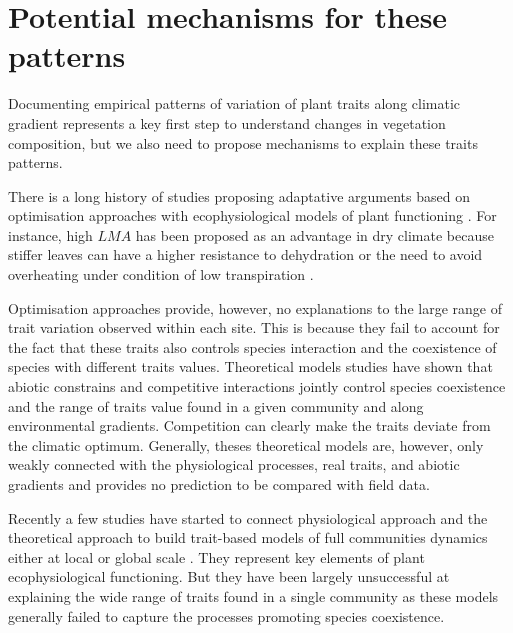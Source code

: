 \documentclass[a4paper,11pt]{article}
\begin{document}
\clearpage

\section{Potential mechanisms for these patterns}

Documenting empirical patterns of variation of plant traits along
climatic gradient represents a key first step to understand changes in
vegetation composition, but we also need to propose mechanisms to
explain these traits patterns. 


There is a long history of studies
proposing adaptative arguments based on optimisation approaches with
ecophysiological models of plant functioning \citep{Makela-2002}. For instance, high $LMA$ has been proposed as an advantage in dry climate because
stiffer leaves can have a higher resistance to dehydration
\citep{Wright-2002a,Wright-2002b} or the need to avoid overheating
under condition of low transpiration \citep{Leigh-2012}.


Optimisation approaches provide, however, no explanations to the large range of trait variation observed
within each site. This is because they fail to account for the fact that
these traits also controls species interaction and the coexistence of
species with different traits values. 
Theoretical models \citep{Case-2000,Goldberg-2006,Leimar-2008}
studies have shown that abiotic constrains and competitive interactions jointly control species coexistence \citep{Chesson-2018} and the range of traits
value found in a given community and along environmental gradients. Competition can clearly make the traits deviate from the climatic optimum.  Generally, theses theoretical models are, however, only weakly connected with the physiological processes, real traits, and abiotic gradients and provides no prediction to be compared with field data. 

Recently a few studies have started to connect physiological approach
and the theoretical approach to build trait-based models of full
communities dynamics either at local \citep{Farrior-2013} or global
scale \citep[see][]{Sakschewski-2015,Scheiter-2013}. They represent key elements of plant ecophysiological functioning. But they have been largely unsuccessful at explaining the wide range of traits found in a single community as these models generally failed to capture the processes promoting species coexistence.
\end{document}
